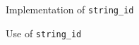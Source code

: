 \begin{frame}{Implementation of \texttt{string\_id}}{}
  \begin{example}
    \small
  \end{example}
\end{frame}


\begin{frame}{Use of \texttt{string\_id}}{}
  \begin{example}
    \small
  \end{example}
\end{frame}







